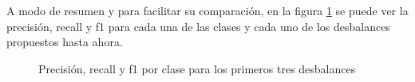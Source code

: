 A modo de resumen y para facilitar su comparación, en la figura \ref{fig:comparaciones} se puede ver la precisión, recall y f1 para cada una de las clases y cada uno de los desbalances propuestos hasta ahora.
\begin{figure}
    \centering
    
    
    \caption{Precisión, recall y f1 por clase para los primeros tres desbalances}
    \label{fig:comparaciones}
\end{figure}

\FloatBarrier

